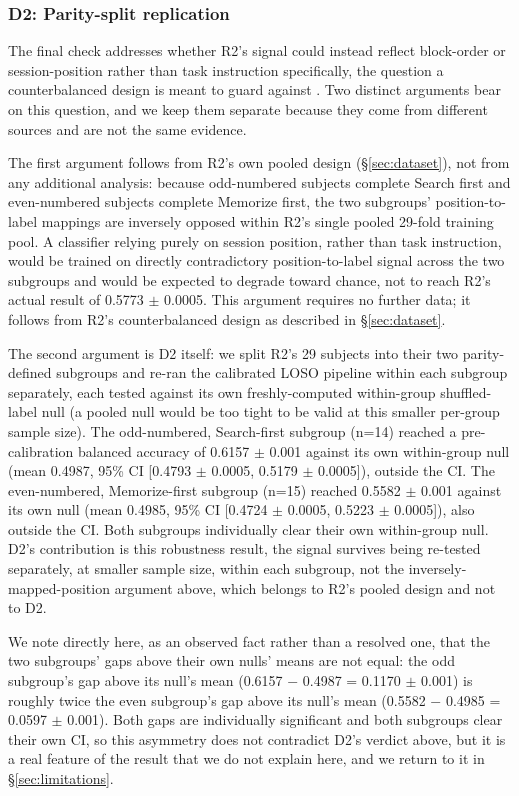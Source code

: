 \documentclass[preprint,12pt]{elsarticle}
\begin{document}
\subsubsection{D2: Parity-split replication}

The final check addresses whether R2's signal could instead reflect block-order or session-position rather than task instruction specifically, the question a counterbalanced design is meant to guard against \cite{greenwald1976}. Two distinct arguments bear on this question, and we keep them separate because they come from different sources and are not the same evidence.

The first argument follows from R2's own pooled design (\S\ref{sec:dataset}), not from any additional analysis: because odd-numbered subjects complete Search first and even-numbered subjects complete Memorize first, the two subgroups' position-to-label mappings are inversely opposed within R2's single pooled 29-fold training pool. A classifier relying purely on session position, rather than task instruction, would be trained on directly contradictory position-to-label signal across the two subgroups and would be expected to degrade toward chance, not to reach R2's actual result of 0.5773 $\pm$ 0.0005. This argument requires no further data; it follows from R2's counterbalanced design as described in \S\ref{sec:dataset}.

The second argument is D2 itself: we split R2's 29 subjects into their two parity-defined subgroups and re-ran the calibrated LOSO pipeline within each subgroup separately, each tested against its own freshly-computed within-group shuffled-label null (a pooled null would be too tight to be valid at this smaller per-group sample size). The odd-numbered, Search-first subgroup (n=14) reached a pre-calibration balanced accuracy of 0.6157 $\pm$ 0.001 against its own within-group null (mean 0.4987, 95\% CI [0.4793 $\pm$ 0.0005, 0.5179 $\pm$ 0.0005]), outside the CI. The even-numbered, Memorize-first subgroup (n=15) reached 0.5582 $\pm$ 0.001 against its own null (mean 0.4985, 95\% CI [0.4724 $\pm$ 0.0005, 0.5223 $\pm$ 0.0005]), also outside the CI. Both subgroups individually clear their own within-group null. D2's contribution is this robustness result, the signal survives being re-tested separately, at smaller sample size, within each subgroup, not the inversely-mapped-position argument above, which belongs to R2's pooled design and not to D2.

We note directly here, as an observed fact rather than a resolved one, that the two subgroups' gaps above their own nulls' means are not equal: the odd subgroup's gap above its null's mean (0.6157 $-$ 0.4987 = 0.1170 $\pm$ 0.001) is roughly twice the even subgroup's gap above its null's mean (0.5582 $-$ 0.4985 = 0.0597 $\pm$ 0.001). Both gaps are individually significant and both subgroups clear their own CI, so this asymmetry does not contradict D2's verdict above, but it is a real feature of the result that we do not explain here, and we return to it in \S\ref{sec:limitations}.
\end{document}
